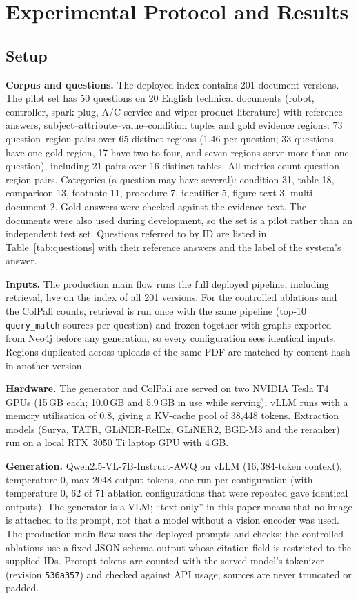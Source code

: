 \documentclass[runningheads]{llncs}
\begin{document}
\section{Experimental Protocol and Results}
\subsection{Setup}
\textbf{Corpus and questions.} The deployed index contains 201 document versions. The pilot set has 50 questions on 20 English technical documents (robot, controller, spark-plug, A/C service and wiper product literature) with reference answers, subject--attribute--value--condition tuples and gold evidence regions: 73 question--region pairs over 65 distinct regions (1.46 per question; 33 questions have one gold region, 17 have two to four, and seven regions serve more than one question), including 21 pairs over 16 distinct tables. All metrics count question--region pairs. Categories (a question may have several): condition 31, table 18, comparison 13, footnote 11, procedure 7, identifier 5, figure text 3, multi-document 2. Gold answers were checked against the evidence text. The documents were also used during development, so the set is a pilot rather than an independent test set. Questions referred to by ID are listed in Table~\ref{tab:questions} with their reference answers and the label of the system's answer.

\textbf{Inputs.} The production main flow runs the full deployed pipeline, including retrieval, live on the index of all 201 versions. For the controlled ablations and the ColPali counts, retrieval is run once with the same pipeline (top-10 \texttt{query\_match} sources per question) and frozen together with graphs exported from Neo4j before any generation, so every configuration sees identical inputs. Regions duplicated across uploads of the same PDF are matched by content hash in another version.

\textbf{Hardware.} The generator and ColPali are served on two NVIDIA Tesla T4 GPUs (15\,GB each; 10.0\,GB and 5.9\,GB in use while serving); vLLM runs with a memory utilisation of 0.8, giving a KV-cache pool of 38{,}448 tokens. Extraction models (Surya, TATR, GLiNER-RelEx, GLiNER2, BGE-M3 and the reranker) run on a local RTX~3050 Ti laptop GPU with 4\,GB.

\textbf{Generation.} Qwen2.5-VL-7B-Instruct-AWQ on vLLM ($16{,}384$-token context), temperature 0, max 2048 output tokens, one run per configuration (with temperature 0, 62 of 71 ablation configurations that were repeated gave identical outputs). The generator is a VLM; ``text-only'' in this paper means that no image is attached to its prompt, not that a model without a vision encoder was used. The production main flow uses the deployed prompts and checks; the controlled ablations use a fixed JSON-schema output whose citation field is restricted to the supplied IDs. Prompt tokens are counted with the served model's tokenizer (revision \texttt{536a357}) and checked against API usage; sources are never truncated or padded.
\end{document}
